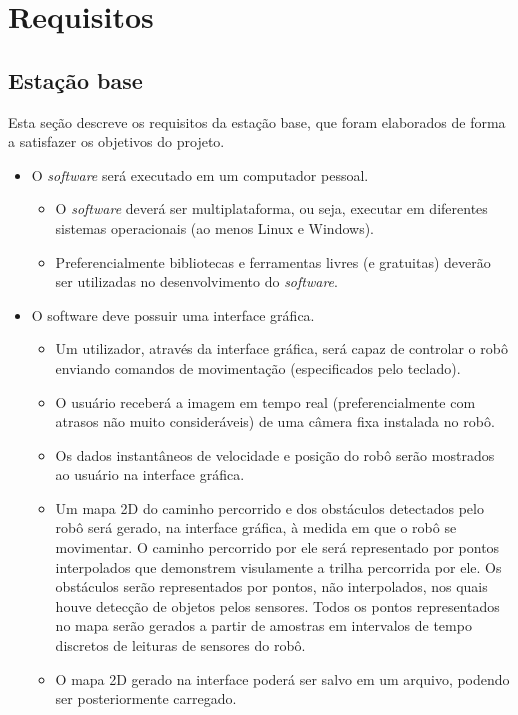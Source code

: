 \section{Requisitos}


\subsection{Estação base}
%
Esta seção descreve os requisitos da estação base, que foram elaborados de forma a satisfazer os objetivos do projeto.

\begin{itemize} %

  \item O \textit{software} será executado em um computador pessoal.
    \begin{itemize}
      \item O \textit{software} deverá ser multiplataforma, ou seja, executar em diferentes sistemas operacionais (ao menos Linux e Windows).
      \item Preferencialmente bibliotecas e ferramentas livres (e gratuitas) deverão ser utilizadas no desenvolvimento do \textit{software}.
    \end{itemize}

  \item O software deve possuir uma interface gráfica.
    \begin{itemize}
      \item Um utilizador, através da interface gráfica, será capaz de controlar o robô enviando comandos de movimentação (especificados pelo teclado). 
      \item O usuário receberá a imagem em tempo real (preferencialmente com atrasos não muito consideráveis) de uma câmera fixa instalada no robô. 
      \item Os dados instantâneos de velocidade e posição do robô serão mostrados ao usuário na interface gráfica.
      \item Um mapa 2D do caminho percorrido e dos obstáculos detectados pelo robô será gerado, na interface gráfica, à medida em que o robô se movimentar. O caminho percorrido por ele será representado por pontos interpolados que demonstrem visulamente a trilha percorrida por ele. Os obstáculos serão representados por pontos, não interpolados, nos quais houve detecção de objetos pelos sensores. Todos os pontos representados no mapa serão gerados a partir de amostras em intervalos de tempo discretos de leituras de sensores do robô.
      \item O mapa 2D gerado na interface poderá ser salvo em um arquivo, podendo ser posteriormente carregado.
    \end{itemize}

\end{itemize} %



